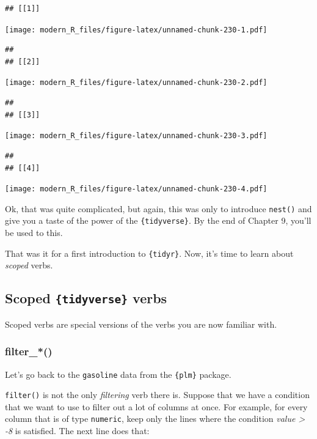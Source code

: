 \documentclass[]{gitbook}
\theoremstyle{definition}
\theoremstyle{definition}
\theoremstyle{definition}
\theoremstyle{remark}
\begin{document}
\begin{verbatim}
## [[1]]
\end{verbatim}

\texttt{[image: modern\_R\_files/figure-latex/unnamed-chunk-230-1.pdf]}

\begin{verbatim}
## 
## [[2]]
\end{verbatim}

\texttt{[image: modern\_R\_files/figure-latex/unnamed-chunk-230-2.pdf]}

\begin{verbatim}
## 
## [[3]]
\end{verbatim}

\texttt{[image: modern\_R\_files/figure-latex/unnamed-chunk-230-3.pdf]}

\begin{verbatim}
## 
## [[4]]
\end{verbatim}

\texttt{[image: modern\_R\_files/figure-latex/unnamed-chunk-230-4.pdf]}

Ok, that was quite complicated, but again, this was only to introduce
\texttt{nest()} and give you a taste of the power of the
\texttt{\{tidyverse\}}. By the end of Chapter 9, you'll be used to this.

That was it for a first introduction to \texttt{\{tidyr\}}. Now, it's
time to learn about \emph{scoped} verbs.

\hypertarget{scoped-tidyverse-verbs}{%
\subsection{\texorpdfstring{Scoped \texttt{\{tidyverse\}}
verbs}{Scoped \{tidyverse\} verbs}}\label{scoped-tidyverse-verbs}}

Scoped verbs are special versions of the verbs you are now familiar
with.

\hypertarget{filter_}{%
\subsubsection{filter\_*()}\label{filter_}}

Let's go back to the \texttt{gasoline} data from the \texttt{\{plm\}}
package.

\texttt{filter()} is not the only \emph{filtering} verb there is.
Suppose that we have a condition that we want to use to filter out a lot
of columns at once. For example, for every column that is of type
\texttt{numeric}, keep only the lines where the condition \emph{value
\textgreater{} -8} is satisfied. The next line does that:
\end{document}
